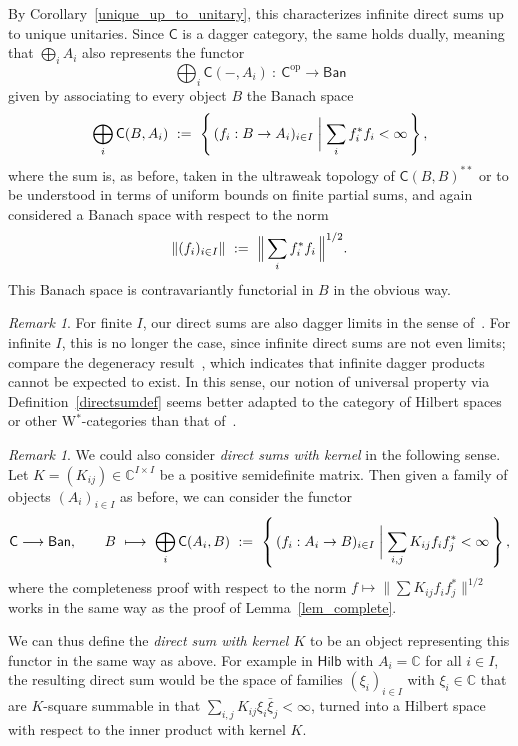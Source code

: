 \documentclass[reqno,T1,11pt]{amsproc}
\newcommand{\C}{\mathbb{C}}
\newcommand{\op}{\mathrm{op}}
\newcommand{\cat}[1]{\mathsf{#1}}		%
\newcommand{\Ban}{\mathsf{Ban}}			%
\newcommand{\Hilb}{\mathsf{Hilb}} 		%
\theoremstyle{plain}
\theoremstyle{remark}
\newtheorem{rem}[thm]{Remark}
\numberwithin{equation}{section}
\begin{document}
By Corollary~\ref{unique_up_to_unitary}, this characterizes infinite direct sums up to unique unitaries. Since $\cat{C}$ is a dagger category, the same holds dually, meaning that $\bigoplus_i A_i$ also represents the functor
\[
	\bigoplus_i \cat{C}(-,A_i) \: : \: \cat{C}^\op \to \Ban
\]
given by associating to every object $B$ the Banach space
\[
	\bigoplus_i \cat{C}(B, A_i) \ := \ \left\{\, (f_i : B \to A_i)_{i\in I} \biggm\vert \sum_i f_i^* f_i < \infty \,\right\},
\]
where the sum is, as before, taken in the ultraweak topology of $\cat{C}(B,B)^{**}$ or to be understood in terms of uniform bounds on finite partial sums, and again considered a Banach space with respect to the norm
\[
	\| (f_i)_{i \in I} \|\  := \ \Bigl\| \,\sum_i f_i^* f_i \,\Bigr\|^{1/2}.
\]
This Banach space is contravariantly functorial in $B$ in the obvious way.

\begin{rem}
For finite $I$, our direct sums are also dagger limits in the sense of~\cite{daglims}. For infinite $I$, this is no longer the case, since infinite direct sums are not even limits; compare the degeneracy result~\cite[Theorem~5.2]{daglims}, which indicates that infinite dagger products cannot be expected to exist. In this sense, our notion of universal property via Definition~\ref{directsumdef} seems better adapted to the category of Hilbert spaces or other W$^*$-categories than that of~\cite{daglims}.
\end{rem}

\begin{rem}
	We could also consider \emph{direct sums with kernel} in the following sense. Let $K = (K_{ij}) \in \C^{I\times I}$ be a positive semidefinite matrix. Then given a family of objects $(A_i)_{i\in I}$ as before, we can consider the functor
	\[
		\cat{C}\longrightarrow \Ban, \qquad B\ \longmapsto\ \bigoplus_i \cat{C}(A_i, B) \ := \ \left\{\, (f_i : A_i \to B)_{i\in I} \biggm\vert \sum_{i,j} K_{ij} f_i f_j^* < \infty \,\right\},
	\]
	where the completeness proof with respect to the norm $f\mapsto \| \sum K_{ij} f_i f_j^* \|^{1/2}$ works in the same way as the proof of Lemma~\ref{lem_complete}.

	We can thus define the \emph{direct sum with kernel $K$} to be an object representing this functor in the same way as above. For example in $\Hilb$ with $A_i = \C$ for all $i\in I$, the resulting direct sum would be the space of families $(\xi_i)_{i\in I}$ with $\xi_i\in\C$ that are $K$-square summable in that $\sum_{i,j} K_{ij} \xi_i \bar{\xi}_j < \infty$, turned into a Hilbert space with respect to the inner product with kernel $K$.
\end{rem}
\end{document}
